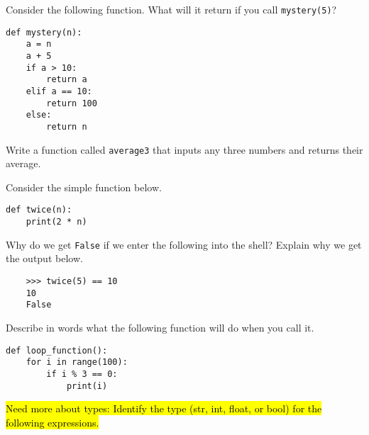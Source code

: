 \documentclass[12pt,answers]{exam}
\begin{document}
\begin{questions}

\newpage
\question Consider the following function.  What will it return if you call \verb|mystery(5)|?

\begin{lstlisting}
def mystery(n):
    a = n 
    a + 5
    if a > 10:
        return a
    elif a == 10:
        return 100
    else:
        return n
\end{lstlisting}

\question Write a function called \verb|average3| that inputs any three numbers and returns their average.  
\vfill

\question Consider the simple function below.

\begin{lstlisting}
def twice(n):
    print(2 * n)
\end{lstlisting}

Why do we get \verb|False| if we enter the following into the shell? Explain why we get the output below. 

\begin{verbatim}
    >>> twice(5) == 10
    10
    False
\end{verbatim}
\vfill

\question Describe in words what the following function will do when you call it.

\begin{lstlisting}
def loop_function():
    for i in range(100):
        if i % 3 == 0:
            print(i)
\end{lstlisting}

\question \hl{Need more about types: Identify the type (str, int, float, or bool) for the following expressions.}
\end{questions}
\end{document}
